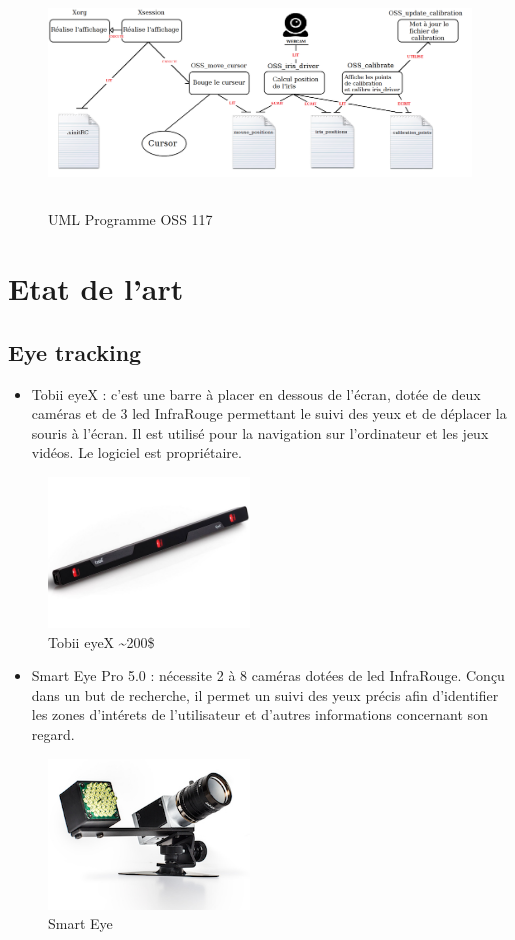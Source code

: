 \documentclass[a4paper, 12pt]{report}
\begin{document}
\begin{figure}[H]
\centering\includegraphics[height=6cm]{algoOSS.png}
\caption{UML Programme OSS 117}
\end{figure}
        
	\chapter{Etat de l'art}
    \section{Eye tracking}
 
\begin{itemize}
\item Tobii\cite{c1} eyeX : c'est une barre à placer en dessous de l'écran, dotée de deux caméras et de 3 led InfraRouge permettant le suivi des yeux et de déplacer la souris à l'écran. Il est utilisé pour la navigation sur l'ordinateur et les jeux vidéos. Le logiciel est propriétaire.
\end{itemize}
\begin{figure}[!ht]
\centering
\includegraphics[height=4cm]{tobii.jpg}
\caption{Tobii eyeX \textasciitilde 200\$}
\end{figure}
\begin{itemize}
\item Smart Eye\cite{c2} Pro 5.0 : nécessite 2 à 8 caméras dotées de led InfraRouge. Conçu dans un but de recherche, il permet un suivi des yeux précis afin d'identifier les zones d'intérets de l'utilisateur et d'autres informations concernant son regard.
\end{itemize}
\begin{figure}[!ht]
\centering
\includegraphics[height=4cm]{Smarteye.jpg}
\caption{Smart Eye}
\end{figure}
\newpage
\end{document}
